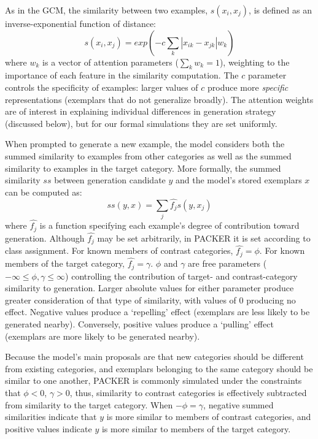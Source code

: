 \documentclass[10pt,letterpaper]{article}
\begin{document}
As in the GCM, the similarity between two examples, $s(x_i, x_j)$, is defined as an inverse-exponential function of distance:
\begin{equation}
  s(x_i,x_j) = exp( -c \sum_{k}{|x_{ik} - x_{jk}|}w_k ) 
\end{equation}
where $w_k$ is a vector of attention parameters ($\sum_k{w_k} = 1$), weighting to the importance of each feature in the similarity computation. The $c$ parameter controls the specificity of examples: larger values of $c$ produce more \textit{specific} representations (exemplars that do not generalize broadly). The attention weights are of interest in explaining individual differences in generation strategy (discussed below), but for our formal simulations they are set uniformly.

When prompted to generate a new example, the model considers both the summed similarity to examples from other categories as well as the summed similarity to examples in the target category. More formally, the summed similarity $ss$ between generation candidate $y$ and the model's stored exemplars $x$ can be computed as:
\begin{equation}
  ss(y, x) = \sum_j{\hat{f_j} s(y, x_j)}
\end{equation}
where $\hat{f_j}$ is a function specifying each example's degree of contribution toward generation. Although $\hat{f_j}$ may be set arbitrarily, in PACKER it is set according to class assignment. For known members of contrast categories, $\hat{f_j} = \phi$. For known members of the target category, $\hat{f_j} = \gamma$. $\phi$ and $\gamma$ are free parameters ($-\infty \leq \phi, \gamma \leq \infty$) controlling the contribution of target- and contrast-category similarity to generation. Larger absolute values for either parameter produce greater consideration of that type of similarity, with values of 0 producing no effect. Negative values produce a `repelling' effect (exemplars are less likely to be generated nearby). Conversely, positive values produce a `pulling' effect (exemplars are more likely to be generated nearby). 

Because the model's main proposals are that new categories should be different from existing categories, and exemplars belonging to the same category should be similar to one another, PACKER is commonly simulated under the constraints that $\phi < 0$, $\gamma > 0$, thus, similarity to contrast categories is effectively subtracted from similarity to the target category. When $-\phi = \gamma$, negative summed similarities indicate that $y$ is more similar to members of contrast categories, and positive values indicate $y$ is more similar to members of the target category.
\end{document}
